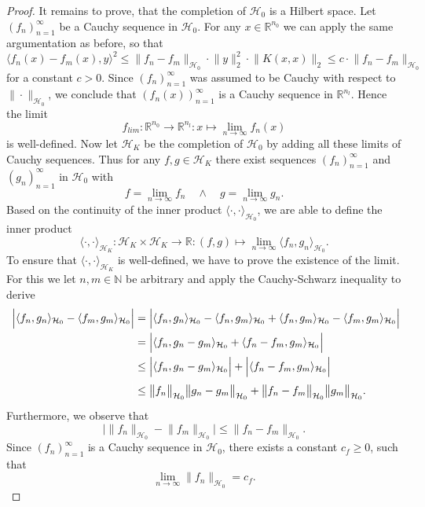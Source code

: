 \documentclass[11pt, a4paper]{article}
\newcommand{\N}{\mathbb{N}}
\newcommand{\R}{\mathbb{R}}
\renewcommand{\H}{\mathcal{H}}
\begin{document}
\begin{proof}
It remains to prove, that the completion of $\H_0$ is a Hilbert space. Let $(f_n)_{n=1}^{\infty}$ be a Cauchy sequence in $\H_0$. For any $x \in \R^{n_0}$ we can apply the same argumentation as before, so that
\[ \big \langle f_n(x) -f_m(x), y \big \rangle^2 \leq \big \| f_n - f_m \big \|_{\H_0} \cdot \big \| y \big \|_2^2 \cdot \big \| K(x,x) \big \|_2 \leq c \cdot \big \| f_n - f_m \big \|_{\H_0} \]
for a constant $c > 0$. Since $(f_n)_{n=1}^{\infty}$ was assumed to be Cauchy with respect to $\| \cdot \|_{\H_0}$, we conclude that $(f_n(x))_{n=1}^{\infty}$ is a Cauchy sequence in $\R^{n_l}$. Hence the limit
\[ f_\textit{lim} : \R^{n_0} \to \R^{n_l} : x \mapsto \lim_{n \to \infty} f_n(x) \]
is well-defined. Now let $\H_K$ be the completion of $\H_0$ by adding all these limits of Cauchy sequences. Thus for any $f,g \in \H_K$ there exist sequences $(f_n)_{n=1}^{\infty}$ and $(g_n)_{n=1}^{\infty}$ in $\H_0$ with 
\[ f = \lim_{n \to \infty} f_n \quad \wedge \quad g = \lim_{n \to \infty} g_n. \]
Based on the continuity of the inner product $\langle \cdot, \cdot \rangle_{\H_0}$, we are able to define the inner product
\[ \langle \cdot, \cdot \rangle_{\H_K} : \H_K \times \H_K \to \R : (f,g) \mapsto \lim_{n \to \infty} \langle f_n, g_n \rangle_{\H_0}. \]
To ensure that $\langle \cdot, \cdot \rangle_{\H_K}$ is well-defined, we have to prove the existence of the limit. For this we let $n, m \in \N$ be arbitrary and apply the Cauchy-Schwarz inequality to derive 
\[ \begin{split}
\Big | \langle f_n, g_n \rangle_{\H_0} - \langle f_m, g_m \rangle_{\H_0} \Big | 
&= \Big | \langle f_n, g_n \rangle_{\H_0} - \langle f_n, g_m \rangle_{\H_0} + \langle f_n, g_m \rangle_{\H_0} - \langle f_m, g_m \rangle_{\H_0} \Big | \\\
&= \Big | \langle f_n, g_n - g_m \rangle_{\H_0} + \langle f_n - f_m, g_m \rangle_{\H_0} \Big | \\\
&\leq \Big | \langle f_n, g_n - g_m \rangle_{\H_0} \Big | + \Big | \langle f_n - f_m, g_m \rangle_{\H_0} \Big | \\\
\textcolor{white}{\Big |} &\leq \big \| f_n \big \|_{\H_0} \big \| g_n - g_m \big \|_{\H_0} + \big \| f_n - f_m \big \|_{\H_0} \big \| g_m \big \|_{\H_0}.
\end{split} \]
Furthermore, we observe that
\[ \Big | \big \| f_n \big \|_{\H_0} - \big \| f_m \big \|_{\H_0} \Big | \leq \big \| f_n - f_m \big \|_{\H_0}. \]
Since $(f_n)_{n=1}^\infty$ is a Cauchy sequence in $\H_0$, there exists a constant $c_f \geq 0$, such that
\[ \lim_{n \to \infty} \| f_n \big \|_{\H_0} = c_f. \]

\end{proof}
\end{document}
